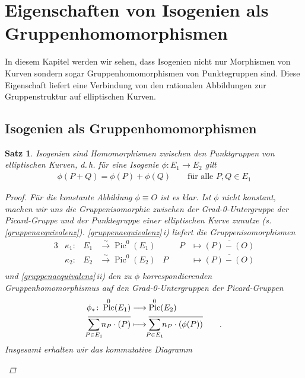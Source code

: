 \documentclass[english, german, parskip=half]{scrartcl}
\newtheorem{Satz}{Satz}[section]
\theoremstyle{definition}
\theoremstyle{remark}
\newcommand*{\longto}{\longrightarrow}
\DeclareMathOperator{\Pic}{Pic} %
\renewcommand{\O}{O}
\begin{document}

\section{Eigenschaften von Isogenien als Gruppenhomomorphismen}
In diesem Kapitel werden wir sehen, dass Isogenien nicht nur
Morphismen von Kurven sondern sogar Gruppenhomomorphismen von
Punktegruppen sind.
Diese Eigenschaft liefert eine Verbindung von den 
rationalen Abbildungen zur Gruppenstruktur auf elliptischen
Kurven.

\subsection{Isogenien als Gruppenhomomorphismen}
\begin{Satz}\label{isogenienhoms}
  Isogenien sind Homomorphismen zwischen den Punktgruppen von
  elliptischen Kurven, d.\,h. für eine Isogenie $\phi\colon E_1\to
  E_2$ gilt
  \begin{gather*}
    \phi(P+Q) = \phi(P) + \phi(Q)
    \qquad \text{für alle } P,Q\in E_1
  \end{gather*}
  \begin{proof}
    Für die konstante Abbildung $\phi\equiv \O$ ist es klar.
    Ist $\phi$ nicht konstant, machen wir uns die Gruppenisomorphie
    zwischen der Grad-0-Untergruppe der Picard-Gruppe und der
    Punktegruppe einer elliptischen Kurve zunutze
    (s.\,\autoref{gruppenaequivalenz}).
    \autoref{gruppenaequivalenz}\,i) liefert die Gruppenisomorphismen 
    \begin{alignat*}{3}
      &\kappa_1\colon&
      E_1&\overset\sim\longto \Pic^0(E_1)
      &\qquad P &\longmapsto \overline{(P)-(\O)}\\
      &\kappa_2\colon&
      E_2&\overset\sim\longto \Pic^0(E_2)
      &P &\longmapsto \overline{(P)-(\O)}\\
    \end{alignat*}
    und \autoref{gruppenaequivalenz}\,ii) den zu $\phi$
    korrespondierenden Gruppenhomomorphismus auf den Grad-0-Untergruppen
    der Picard-Gruppen
    \begin{align*}
      \phi_*\colon \Pic^0(E_1) 
      &\longto \Pic^0(E_2)\\
      \overline{\sum_{\mathclap{P\in E_1}}n_P\cdot(P)}
      &\longmapsto 
        \overline{\sum_{\mathclap{P\in E_1}}n_P\cdot(\phi(P))}
        \qquad .
    \end{align*}
    Insgesamt erhalten wir das kommutative Diagramm
    \begin{center}

\end{center}
\end{proof}
\end{Satz}
\end{document}
